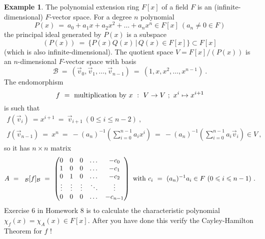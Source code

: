 \documentclass[11pt]{amsbook}
\theoremstyle{definition}
\newtheorem{ex}[theorem]{Example}
\begin{document}
\begin{ex} The polynomial extension ring $F[x]$ of a field $F$ is an (infinite-dimensional) $F$-vector space.
For a degree $n$ polynomial
$$P(x)~=~a_0+a_1x+a_2x^2 + \dots +a_nx^n \in F[x]~(a_n \neq 0 \in F)$$
the principal ideal generated by $P(x)$ is a subspace
$$(P(x))~=~\{P(x)Q(x)\,\vert\,Q(x) \in F[x]\} \subset  F[x]$$
(which is also infinite-dimensional).
The quotient space  $V=F[x]/(P(x))$ is an $n$-dimensional $F$-vector space with basis
$${\mathcal B}~=~(\vec{v}_0,\vec{v}_1,\dots,\vec{v}_{n-1})~=~(1,x,x^2,\dots,x^{n-1})~.$$
The endomorphism
$$f~=~\hbox{multiplication by $x$}~:~V \to V~;~x^i \mapsto x^{i+1}$$
is such that
$$\begin{array}{l}
f(\vec{v}_i)~=x^{i+1}~=~\vec{v}_{i+1}~(0 \leqslant i \leqslant n-2)~,\\[1ex]
f(\vec{v}_{n-1})~=~x^n~=~-(a_n)^{-1}(\sum\limits^{n-1}_{i=0}a_ix^i)~=~-(a_n)^{-1}(\sum\limits^{n-1}_{i=0}a_i\vec{v}_i) \in V~,
\end{array}$$
so it has $n \times n$ matrix
$$A~=~~_{\mathcal B}[f]_{\mathcal B}~=~\begin{pmatrix}
 0 & 0 & 0 & \dots & -c_0 \\
 1 & 0 & 0 & \dots & -c_1 \\
 0 & 1 & 0 & \dots & -c_2 \\
 \vdots & \vdots & \vdots & \ddots & \vdots \\
 0 & 0 & 0 & \dots & -c_{n-1}
 \end{pmatrix}~{\rm with}~c_i~=~(a_n)^{-1}a_i \in F~(0 \leqslant i \leqslant n-1)~.$$
Exercise 6 in Homework  8 is to calculate the characteristic polynomial $\chi_f(x)=\chi_A(x)\in F[x]$.  After you have done this verify the Cayley-Hamilton Theorem
for $f$ !
\end{ex}
\end{document}
